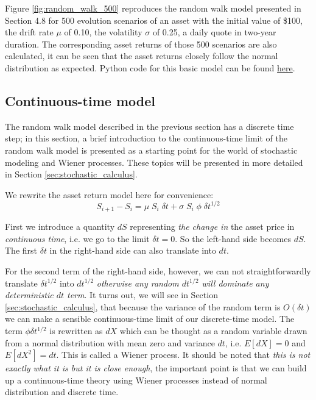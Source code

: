 Figure \ref{fig:random_walk_500} reproduces the random walk model presented in Section 4.8 \cite{pw_iqf2ed_2007} for 500 evolution scenarios of an asset with the initial value of \$100, the drift rate $\mu$ of 0.10, the volatility $\sigma$ of 0.25, a daily quote in two-year duration. The corresponding asset returns of those 500 scenarios are also calculated, it can be seen that the asset returns closely follow the normal distribution as expected. Python code for this basic model can be found \href{https://github.com/chitn/quantfin_study/blob/master/asset_modeling-random_walk.py}{here}.



\subsection{Continuous-time model}
The random walk model described in the previous section has a discrete time step; in this section, a brief introduction to the continuous-time limit of the random walk model is presented as a starting point for the world of stochastic modeling and Wiener processes. These topics will be presented in more detailed in Section \ref{sec:stochastic_calculus}.

We rewrite the asset return model here for convenience:
\begin{equation}
    S_{i+1} - S_i = \mu \; S_i \; \delta t + \sigma \; S_i \; \phi \; \delta t^{1/2}
\end{equation}

First we introduce a quantity $dS$ representing \textit{the change in} the asset price in \textit{continuous time}, i.e. we go to the limit $\delta t = 0$. So the left-hand side becomes $dS$. The first $\delta t$ in the right-hand side can also translate into $dt$. 

For the second term of the right-hand side, however, we can not straightforwardly translate $\delta t^{1/2}$ into $dt^{1/2}$ \textit{otherwise any random $dt^{1/2}$ will dominate any deterministic $dt$ term}. It turns out, we will see in Section \ref{sec:stochastic_calculus}, that because the variance of the random term is $O(\delta t)$ we can make a sensible continuous-time limit of our discrete-time model. The term $\phi \delta t^{1/2}$ is rewritten as $dX$ which can be thought as a random variable drawn from a normal distribution with mean zero and variance $dt$, i.e. $E[dX] = 0$ and $E[dX^2] = dt$. This is called a Wiener process. It should be noted that \textit{this is not exactly what it is but it is close enough}, the important point is that we can build up a continuous-time theory using Wiener processes instead of normal distribution and discrete time. 

